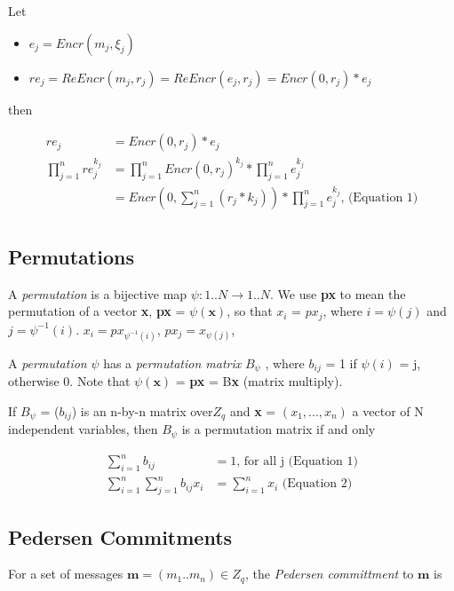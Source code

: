 \documentclass{article}
\begin{document}
Let
\begin{itemize}
\item $e_{j}=Encr(m_{j},\xi_{j})$ 
\item $re_{j}=ReEncr(m_{j},r_{j})=ReEncr(e_{j},r_{j})=Encr(0,r_{j})*e_{j}$ 
\end{itemize}

then

\begin{align*}
re_{j} & =Encr(0,r_{j})*e_{j}\\
\prod_{j=1}^{n}re_{j}^{k_{j}} & =\prod_{j=1}^{n}Encr(0,r_{j})^{k_{j}}*\prod_{j=1}^{n}e_{j}^{k_{j}}\\
 & =Encr(0,\sum_{j=1}^{n}(r_{j}*k_{j}))*\prod_{j=1}^{n}e_{j}^{k_{j}} \text{,    (Equation\ 1)}\\
\end{align*}

\subsection{Permutations}

A \emph{permutation} is a bijective map $\psi:{1..N}\to{1..N}$. We
use \textbf{px} to mean the permutation of a vector \textbf{x}, \textbf{px}
= $\psi(\textbf{x})$, so that $x_{i}$ = $px_{j}$, where $i={\psi(j)}$
and $j={\psi^{-1}(i)}$. $x_{i}=px_{\psi^{-1}(i)}$, $px_{j}=x_{\psi(j)}$,

A \emph{permutation} $\psi$ has a \emph{permutation matrix} $B_{\psi}$
, where $b_{ij}$ = 1 if $\psi(i)$ = j, otherwise 0. Note that $\psi(\textbf{x})$
= \textbf{px} = B\textbf{x} (matrix multiply).

If $B_{\psi}$ = ($b_{ij}$) is an n-by-n matrix over$Z_{q}$ and
\textbf{x} = $(x_{1},...,x_{n})$ a vector of N independent variables,
then $B_{\psi}$ is a permutation matrix if and only

\begin{align*}
\sum_{i=1}^{n}b_{ij} & =1 \text{, for all j         (Equation 1)}\\
\sum_{i=1}^{n}\sum_{j=1}^{n}b_{ij}x_{i} & =\sum_{i=1}^{n}x_{i}\text{    (Equation 2)}
\end{align*}

\subsection{Pedersen Commitments}

For a set of messages $\textbf{m}=(m_{1}..m_{n})\in Z_{q}$, the \emph{Pedersen
committment} to $\textbf{m}$ is
\end{document}
